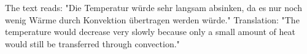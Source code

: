 The text reads:  
"Die Temperatur würde sehr langsam absinken, da es nur noch wenig Wärme durch Konvektion übertragen werden würde."  
Translation:  
"The temperature would decrease very slowly because only a small amount of heat would still be transferred through convection."